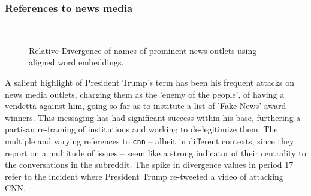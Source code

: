 \subsubsection*{References to news media}

\begin{figure}[t]%

    \centering

     ~
    ~ 
    
    \caption{Relative Divergence of names of prominent news outlets using aligned word embeddings.}%

    \label{fig:div_news}%

\end{figure}

A salient highlight of President Trump's term has been his frequent attacks on news media outlets, charging them as the 'enemy of the people', of having a vendetta against him, going so far as to institute a list of 'Fake News' award winners. This messaging has had significant success within his base, furthering a partisan re-framing of institutions and working to de-legitimize them. The multiple and varying references to \texttt{cnn} -- albeit in different contexts, since they report on a multitude of issues -- seem like a strong indicator of their centrality to the conversations in the subreddit. The spike in divergence values in period 17 refer to the incident where President Trump re-tweeted a video of attacking CNN.  

